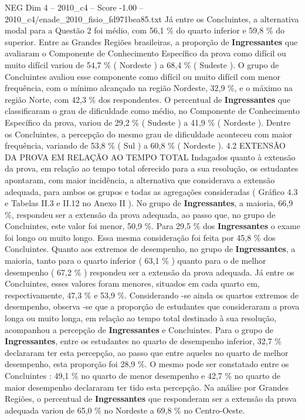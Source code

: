\begin{textsample}{NEG Dim 4 – 2010\_c4 – Score -1.00 – 2010\_c4/enade\_2010\_fisio\_fd971bea85.txt}
Já entre os Concluintes, a alternativa modal para a Questão 2 foi médio, com 56,1 \% do quarto inferior e 59,8 \% do superior.
Entre as Grandes Regiões brasileiras, a proporção de \textbf{Ingressantes} que avaliaram o Componente de Conhecimento Específico da prova como difícil ou muito difícil variou de 54,7 \% ( Nordeste ) a 68,4 \% ( Sudeste ).
O grupo de Concluintes avaliou esse componente como difícil ou muito difícil com menor frequência, com o mínimo alcançado na região Nordeste, 32,9 \%, e o máximo na região Norte, com 42,3 \% dos respondentes.
O percentual de \textbf{Ingressantes} que classificaram o grau de dificuldade como médio, no Componente de Conhecimento Específico da prova, variou de 29,2 \% ( Sudeste ) a 41,9 \% ( Nordeste ).
Dentre os Concluintes, a percepção do mesmo grau de dificuldade aconteceu com maior frequência, variando de 53,8 \% ( Sul ) a 60,8 \% ( Nordeste ). 4.2 EXTENSÃO DA PROVA EM RELAÇÃO AO TEMPO TOTAL Indagados quanto à extensão da prova, em relação ao tempo total oferecido para a sua resolução, os estudantes apontaram, com maior incidência, a alternativa que considerava a extensão adequada, para ambos os grupos e todas as agregações consideradas ( Gráfico 4.3 e Tabelas II.3 e II.12 no Anexo II ).
No grupo de \textbf{Ingressantes}, a maioria, 66,9 \%, respondeu ser a extensão da prova adequada, ao passo que, no grupo de Concluintes, este valor foi menor, 50,9 \%.
Para 29,5 \% dos \textbf{Ingressantes} o exame foi longo ou muito longo.
Essa mesma consideração foi feita por 45,8 \% dos Concluintes.
Quanto aos extremos de desempenho, no grupo de \textbf{Ingressantes}, a maioria, tanto para o quarto inferior ( 63,1 \% ) quanto para o de melhor desempenho ( 67,2 \% ) respondeu ser a extensão da prova adequada.
Já entre os Concluintes, esses valores foram menores, situados em cada quarto em, respectivamente, 47,3 \% e 53,9 \%.
Considerando -se ainda os quartos extremos de desempenho, observa -se que a proporção de estudantes que consideraram a prova longa ou muito longa, em relação ao tempo total destinado à sua resolução, acompanhou a percepção de \textbf{Ingressantes} e Concluintes.
Para o grupo de \textbf{Ingressantes}, entre os estudantes no quarto de desempenho inferior, 32,7 \% declararam ter esta percepção, ao passo que entre aqueles no quarto de melhor desempenho, esta proporção foi 28,9 \%.
O mesmo pode ser constatado entre os Concluintes : 49,1 \% no quarto de menor desempenho e 42,7 \% no quarto de maior desempenho declararam ter tido esta percepção.
Na análise por Grandes Regiões, o percentual de \textbf{Ingressantes} que responderam ser a extensão da prova adequada variou de 65,0 \% no Nordeste a 69,8 \% no Centro-Oeste.

\end{textsample}
